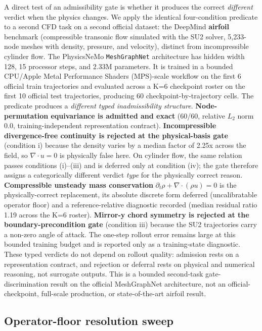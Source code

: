 \documentclass[preprint,12pt,authoryear]{elsarticle}
\begin{document}
A direct test of an admissibility gate is whether it produces the correct \emph{different} verdict when the physics changes. We apply the identical four-condition predicate to a second CFD task on a second official dataset: the DeepMind \textbf{airfoil} benchmark (compressible transonic flow simulated with the SU2 solver, 5{,}233-node meshes with density, pressure, and velocity), distinct from incompressible cylinder flow. The PhysicsNeMo \texttt{MeshGraphNet} architecture has hidden width 128, 15 processor steps, and 2.33M parameters. It is trained in a bounded CPU/Apple Metal Performance Shaders (MPS)-scale workflow on the first 6 official train trajectories and evaluated across a K=6 checkpoint roster on the first 10 official test trajectories, producing 60 checkpoint-by-trajectory cells. The predicate produces a \emph{different typed inadmissibility structure}. \textbf{Node-permutation equivariance is admitted and exact} (60/60, relative \(L_2\) norm 0.0, training-independent representation contract). \textbf{Incompressible divergence-free continuity is rejected at the physical-basis gate} (condition i) because the density varies by a median factor of 2.25x across the field, so $\nabla\cdot u=0$ is physically false here. On cylinder flow, the same relation passes conditions (i)--(iii) and is deferred only at condition (iv); the gate therefore assigns a categorically different verdict \emph{type} for the physically correct reason. \textbf{Compressible unsteady mass conservation} $\partial_t\rho+\nabla\cdot(\rho u)=0$ is the physically-correct replacement, its absolute discrete form deferred (uncalibratable operator floor) and a reference-relative diagnostic recorded (median residual ratio 1.19 across the K=6 roster). \textbf{Mirror-y chord symmetry is rejected at the boundary-precondition gate} (condition iii) because the SU2 trajectories carry a non-zero angle of attack. The one-step rollout error remains large at this bounded training budget and is reported only as a training-state diagnostic. These typed verdicts do not depend on rollout quality: admission rests on a representation contract, and rejection or deferral rests on physical and numerical reasoning, not surrogate outputs. This is a bounded second-task gate-discrimination result on the official MeshGraphNet architecture, not an official-checkpoint, full-scale production, or state-of-the-art airfoil result.

\subsection{Operator-floor resolution sweep}
\label{subsec:operator-floor-sweep}
\end{document}
